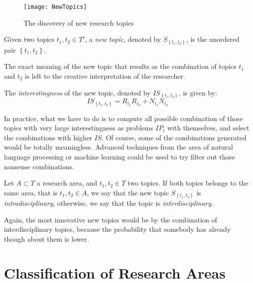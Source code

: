 \begin{figure}[h]
\centering\texttt{[image: NewTopics]}
\caption{\label{fig:New-Topics}The discovery of new research topics}
\end{figure}

\begin{definition}
Given two topics $t_{1}, t_{2} \in T'$, a \emph{new topic}, denoted by $S_{\left\{ t_{1},t_{2}\right\}}$, is the unordered pair $\left\{ t_{1},t_{2}\right\}$.
\end{definition}

The exact meaning of the new topic that results as the combination of topics $t_{1}$ and $t_{2}$ is left to the creative interpretation of the researcher.

\begin{definition}
The \emph{interestingness} of the new topic, denoted by $IS_{\left\{ t_{1},t_{2}\right\} }$, is given by:
\[
IS_{\left\{ t_{1},t_{2}\right\} } = R_{t_{1}}R_{t_{2}}+N_{t_{1}}N_{t_{2}}
\]
\end{definition}

In practice, what we have to do is to compute all possible combination of those topics with very large interestingness as problems $IP_{t}$ with themselves, and select the combinations with higher $IS$. Of course, some of the combinations generated would be totally meaningless. Advanced techniques from the area of natural language processing or machine learning could be used to try filter out those nonsense combinations.

\begin{definition} 
Let $A \subset T$ a research area, and $t_{1}, t_{2} \in T$ two topics. If both topics belongs to the same area, that is $t_{1}, t_{2} \in A$, we say that the new topic $S_{\left\{ t_{1},t_{2}\right\} }$ is \emph{intradisciplinary}, otherwise, we say that the topic is \emph{interdisciplinary}.
\end{definition}

Again, the most innovative new topics would be by the combination of interdisciplinary topics, because the probability that somebody has already though about them is lower.

%
%

\section{Classification of Research Areas}


